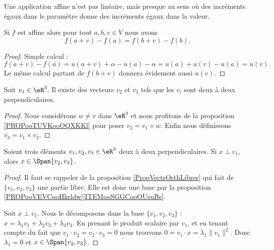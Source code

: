 Une application affine n'est pas linéaire, mais presque au sens où des incréments égaux dans le paramètre donne des incréments égaux dans la valeur.
\begin{lemma}       \label{LEMooEQEAooQaFCMW}
	Si \( f\) est affine alors pour tout \( a,b,v\in V\) nous avons
	\begin{equation}
		f(a+v)-f(a)=f(b+v)-f(b).
	\end{equation}
\end{lemma}

\begin{proof}
	Simple calcul :
	\begin{equation}
		f(a+v)-f(a)=u(a+v)+\alpha-u(a)-\alpha=u(a)+u(v)-u(a)=u(v).
	\end{equation}
	Le même calcul partant de \( f(b+v)\) donnera évidement aussi \( u(v)\).
\end{proof}

\begin{lemma}       \label{LEMooGUVMooPXtXnV}
	Soit \( v_1\in \eR^3\). Il existe des vecteurs \( v_2\) et \( v_3\) tels que les \( v_i\) sont deux à deux perpendiculaires.
\end{lemma}

\begin{proof}
	Nous considérons \( w\neq v\) dans \( \eR^3\) et nous profitons de la proposition \ref{PROPooTUVKooOQXKKl} pour poser \( v_2=v_1\times w\). Enfin nous définissons \( v_3=v_1\times v_2\).
\end{proof}

\begin{lemma}       \label{LEMooGXGCooDfgbqG}
	Soient trois éléments \( v_1,v_2,v_3\in \eR^3\) deux à deux perpendiculaires. Si \( x\perp v_1\), alors \( x\in \Span\{ v_2,v_3 \}\).
\end{lemma}

\begin{proof}
	Il faut se rappeler de la proposition \ref{PropVectsOrthLibres} qui fait de \( \{ v_1,v_2,v_3 \}\) une partie libre. Elle est donc une base par la proposition \ref{PROPooVEVCooHkrldw}\ref{ITEMooSGGCooOUsuBs}.

	Soit \( x\perp v_1\). Nous le décomposons dans la base \( \{ v_1,v_2,v_3 \}\) : \( x=\lambda_1 v_1+\lambda_2 v_2+\lambda_3v_3\). En prenant le produit scalaire par \( v_1\), et en tenant compte du fait que \( v_1\cdot v_2=v_2\cdot v_3=0\) nous trouvons \( 0=v_1\cdot x=\lambda_1\| v_1 \|^2\). Donc \( \lambda_1=0\) et \( x\in \Span\{ v_2,v_3 \}\).
\end{proof}

